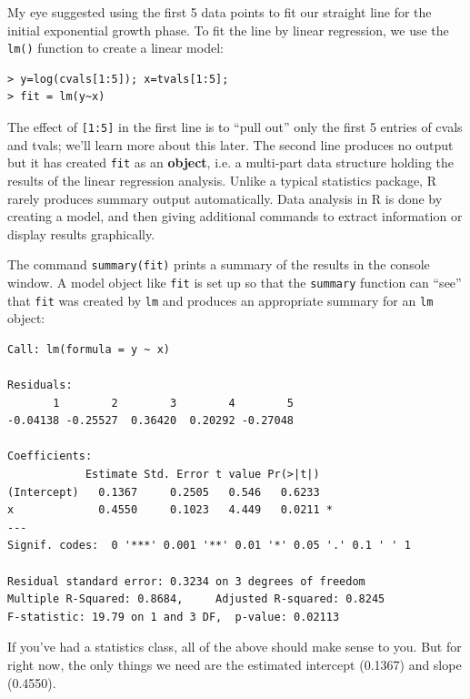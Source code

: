 \documentclass [11pt]{article}
\newcommand{\blst}{\vspace{-0.035in} \begin{lstlisting}}
\newcommand{\ttt}[1]{\texttt{#1}}
\numberwithin{exercise}{section}
\def\R{R }
\begin{document}
My eye suggested using the first 5 data points to fit our straight line for the initial
exponential growth phase. To fit the line by linear regression, we use the
\texttt{lm()} function to create a linear model:
\blst
> y=log(cvals[1:5]); x=tvals[1:5]; 
> fit = lm(y~x)
\end{lstlisting} 
The effect of \ttt{[1:5]} in the first line is to ``pull out'' only the first 5 entries of
cvals and tvals; we'll learn more about this later. The second line 
produces no output but it has created \texttt{fit}  
as an \textbf{object}, i.e. a multi-part data structure holding the results of the 
linear regression analysis. Unlike a typical statistics package, 
\R rarely produces summary output automatically. Data analysis in \R is done by creating a 
model, and then giving additional commands to extract information 
or display results graphically.

The command \ttt{summary(fit)} prints a summary of the results in the console window. 
A model object like \ttt{fit} is set up so that the \texttt{summary} function 
can ``see'' that \texttt{fit} was created by \texttt{lm} and produces an appropriate
summary for an \texttt{lm} object: 

\blst
Call: lm(formula = y ~ x)

Residuals:
       1        2        3        4        5 
-0.04138 -0.25527  0.36420  0.20292 -0.27048 

Coefficients:
            Estimate Std. Error t value Pr(>|t|)  
(Intercept)   0.1367     0.2505   0.546   0.6233  
x             0.4550     0.1023   4.449   0.0211 *
---
Signif. codes:  0 '***' 0.001 '**' 0.01 '*' 0.05 '.' 0.1 ' ' 1 

Residual standard error: 0.3234 on 3 degrees of freedom
Multiple R-Squared: 0.8684,     Adjusted R-squared: 0.8245 
F-statistic: 19.79 on 1 and 3 DF,  p-value: 0.02113 
\end{lstlisting}
If you've had a statistics class, all of the above should make sense
to you. But for right now, the only things we need are the estimated
intercept (0.1367) and slope (0.4550). 
\end{document}
